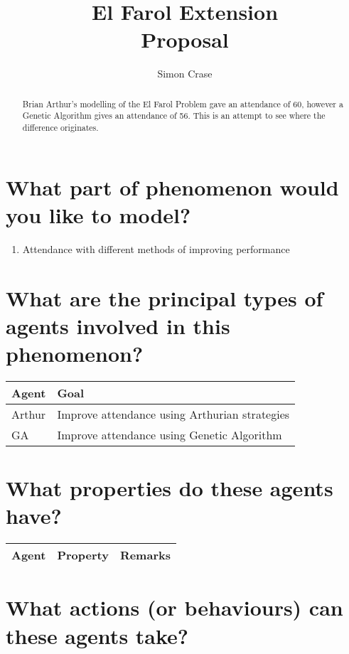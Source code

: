 \documentclass[]{article}
\title{El Farol Extension\\Proposal}
\author{Simon Crase}
\begin{document}
\maketitle

\begin{abstract}
	Brian Arthur's modelling of the El Farol Problem gave an attendance of 60\cite{arthur1994inductive}, however a Genetic Algorithm gives an attendance of 56\cite{fogel1999inductive}. This is an attempt to see where the difference originates.
\end{abstract}


 
\section{What part of phenomenon would you like to model?}

\begin{enumerate}
	\item Attendance with different methods of improving performance 
\end{enumerate}

\section{What are the principal types of agents involved in this phenomenon?}

\begin{tabular}{|l|l|} \hline
	Agent&Goal\\ \hline
	Arthur&Improve attendance using Arthurian strategies\\ \hline
	GA&Improve attendance using Genetic Algorithm\\ \hline
\end{tabular}

\section{What properties do these agents have?}

\begin{center}
	\begin{tabular}{ |l|l|l| } 
		\hline
		Agent & Property & Remarks \\
		\hline

		\hline
	\end{tabular}
\end{center}



\section{What actions (or behaviours) can these agents take?}
\end{document}
